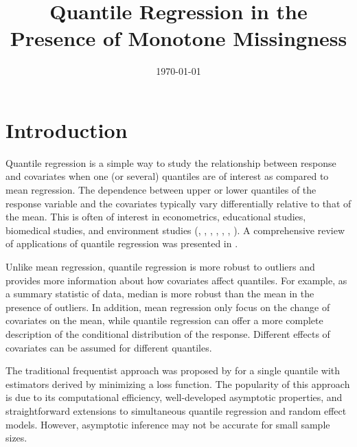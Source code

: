 \documentclass[12pt]{article}
\title{Quantile Regression in the Presence of Monotone Missingness}
\date{\today}
\author{}
\begin{document}
\maketitle

\begin{abstract}
\end{abstract}

\section{Introduction}

Quantile regression is a simple way to study the relationship between
response and covariates when one (or several) quantiles are of
interest as compared to mean regression.  The dependence between upper
or lower quantiles of the response variable and the covariates
typically vary differentially relative to that of the mean. This is
often of interest in econometrics, educational studies, biomedical
studies, and environment studies (\citep{yu2001},
\citep{buchinsky1994}, \citep{buchinsky1998}, \citep{he1998},
\citep{koenker1999}, \citep{wei2006}, \citep{yu2003}). A comprehensive
review of applications of quantile regression was presented in
\citep{koenker2005}.

Unlike mean regression, quantile regression is more robust to outliers
and provides more information about how covariates affect
quantiles. For example, as a summary statistic of data, median is more
robust than the mean in the presence of outliers.  In addition, mean
regression only focus on the change of covariates on the mean, while
quantile regression can offer a more complete description of the
conditional distribution of the response. Different effects of
covariates can be assumed for different quantiles.

The traditional frequentist approach was proposed by
\citep{koenker1978} for a single quantile with estimators derived by
minimizing a loss function. The popularity of this approach is due to
its computational efficiency, well-developed asymptotic properties,
and straightforward extensions to simultaneous quantile regression and
random effect models. However, asymptotic inference may not be
accurate for small sample sizes.
\end{document}
